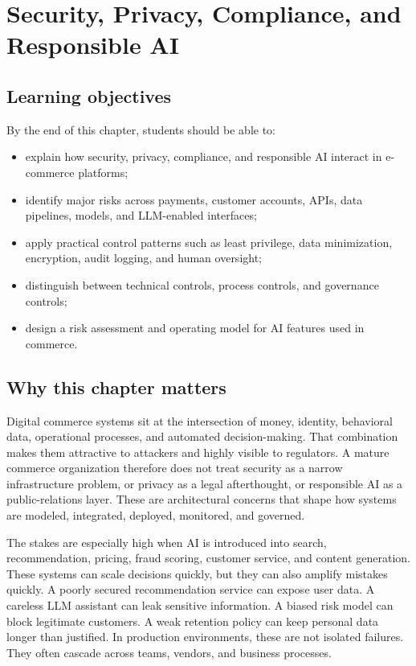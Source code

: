 \chapter[Security, Privacy, and Responsible AI]{Security, Privacy, Compliance, and Responsible AI}

\section{Learning objectives}
By the end of this chapter, students should be able to:
\begin{itemize}
  \item explain how security, privacy, compliance, and responsible AI interact in e-commerce platforms;
  \item identify major risks across payments, customer accounts, APIs, data pipelines, models, and LLM-enabled interfaces;
  \item apply practical control patterns such as least privilege, data minimization, encryption, audit logging, and human oversight;
  \item distinguish between technical controls, process controls, and governance controls;
  \item design a risk assessment and operating model for AI features used in commerce.
\end{itemize}

\section{Why this chapter matters}
Digital commerce systems sit at the intersection of money, identity, behavioral data, operational processes, and automated decision-making. That combination makes them attractive to attackers and highly visible to regulators. A mature commerce organization therefore does not treat security as a narrow infrastructure problem, or privacy as a legal afterthought, or responsible AI as a public-relations layer. These are architectural concerns that shape how systems are modeled, integrated, deployed, monitored, and governed.

The stakes are especially high when AI is introduced into search, recommendation, pricing, fraud scoring, customer service, and content generation. These systems can scale decisions quickly, but they can also amplify mistakes quickly. A poorly secured recommendation service can expose user data. A careless LLM assistant can leak sensitive information. A biased risk model can block legitimate customers. A weak retention policy can keep personal data longer than justified. In production environments, these are not isolated failures. They often cascade across teams, vendors, and business processes.

